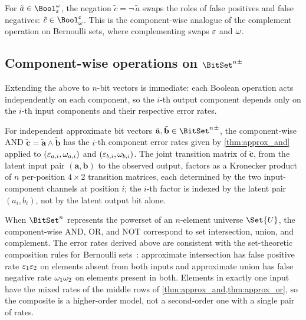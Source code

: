 \documentclass[ ../main.tex]{subfiles}
\begin{document}
\begin{remark}
\label{rem:approx_not}
For $\tilde{a} \in \AT{\Bool}[\fprate][\fnrate]$, the negation
$\tilde{c} = \neg\,\tilde{a}$ swaps the roles of false positives and
false negatives: $\tilde{c} \in \AT{\Bool}[\fnrate][\fprate]$.
This is the component-wise analogue of the complement operation on
Bernoulli sets, where complementing swaps $\varepsilon$ and $\omega$.
\end{remark}

\subsection{Component-wise operations on \texorpdfstring{$\AT{\BitSet^n}$}{AT(B\^{}n)}}

Extending the above to $n$-bit vectors is immediate: each Boolean operation
acts independently on each component, so the $i$-th output component
depends only on the $i$-th input components and their respective error rates.

\begin{corollary}
\label{cor:bitvec_and}
For independent approximate bit vectors
$\tilde{\mathbf{a}}, \tilde{\mathbf{b}} \in \AT{\BitSet^n}$,
the component-wise AND $\tilde{\mathbf{c}} = \tilde{\mathbf{a}} \wedge \tilde{\mathbf{b}}$
has the $i$-th component error rates given by \cref{thm:approx_and}
applied to $(\varepsilon_{a,i}, \omega_{a,i})$ and $(\varepsilon_{b,i}, \omega_{b,i})$.
The joint transition matrix of $\tilde{\mathbf{c}}$, from the latent input pair
$(\mathbf{a}, \mathbf{b})$ to the observed output, factors as a Kronecker
product of $n$ per-position $4 \times 2$ transition matrices, each determined by the two
input-component channels at position $i$; the $i$-th factor is indexed by the latent pair
$(a_i, b_i)$, not by the latent output bit alone.
\end{corollary}

\begin{remark}
When $\BitSet^n$ represents the powerset of an $n$-element universe $\Set{U}$,
the component-wise AND, OR, and NOT correspond to set intersection, union,
and complement.
The error rates derived above are consistent with the set-theoretic
composition rules for Bernoulli sets~\cite{bernoulliComposition}:
approximate intersection has false positive rate
$\varepsilon_1 \varepsilon_2$ on elements absent from both inputs and approximate union has false negative
rate $\omega_1 \omega_2$ on elements present in both.
Elements in exactly one input have the mixed rates of the middle rows of
\cref{thm:approx_and,thm:approx_or}, so the composite is a higher-order model, not a
second-order one with a single pair of rates.
\end{remark}
\end{document}

